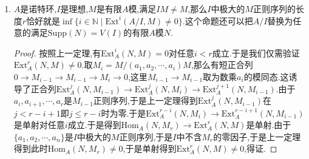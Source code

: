 \begin{enumerate}
\begin{proof}
		\qquad
		
		于是$n=1$得证.下面设$n\ge2$,取$a\in I$是一个$M$正则元,考虑短正合列$0\to M\to M\to M'\to0$.这里$M\to M$取做数乘$a$的模同态,这里$M'=M/aM$.那么这个短正合列诱导了长正合列$\cdots\to\mathrm{Ext}^i(N,M)\to\mathrm{Ext}^i(N,M)\to\mathrm{Ext}^i(N,M')\to\mathrm{Ext}^{i+1}(N,M)\to\cdots$.那么有$\mathrm{Ext}^i(N,M')=0$对任意$i<n$成立.于是归纳假设知$M'=M/aM$中存在长度为$n-1$的$M'$正则序列$\{a_1,a_2,\cdots,a_{n-1}\}$,于是$\{a,a_1,a_2,\cdots,a_{n-1}\}$是$M$正则序列.
		
		\qquad
		
		最后证明(d)$\Rightarrow$(a),对$n$归纳,设$I$中有$M$正则序列$\{a_1,a_2,\cdots,a_n\}$.记$M'=M/a_1M$,那么有短正合列$0\to M\to M\to M'\to0$,这里$M\to M$是数乘$a_1$的映射.那么$M'$中存在长度为$n-1$的正则序列.按照归纳假设,有$\mathrm{Ext}^i(N,M')=0$对任意的$i<n-1$和任意满足条件的$N$成立(对$n=1$这是平凡的).于是对任意$i<n$有长正合列中的$f:\mathrm{Ext}^i(N,M)\to\mathrm{Ext}^i(N,M)$的由数乘$a_1$诱导的同态是单的.下面按照条件有$V(\mathrm{Ann}(N))=\mathrm{Supp}(N)\subseteq V(I)$,于是$a_1\in I\subset\sqrt{\mathrm{Ann}(N)}$.于是有某个次幂$a_i^uN=0$.但是$f$就是数乘$a_1$的映射(写出同调的定义).于是$f$的某个次幂是零映射,结合它是单射,得到$\mathrm{Ext}^i(N,M)=0,\forall i<n$.
	\end{proof}
	\item $A$是诺特环,$I$是理想,$M$是有限$A$模,满足$IM\not=M$,那么$I$中极大的$M$正则序列的长度$r$恰好就是$\inf\{i\in\mathbb{N}\mid \mathrm{Ext}^i(A/I,M)\not=0\}$.这个命题还可以把$A/I$替换为任意的满足$\mathrm{Supp}(N)=V(I)$的有限$A$模$N$.
	\begin{proof}
		
		按照上一定理,有$\mathrm{Ext}^i_A(N,M)=0$对任意$i<r$成立.于是我们仅需验证$\mathrm{Ext}^r_A(N,M)\not=0$.取$M_i=M/(a_1,a_2,\cdots,a_i)M$,那么有短正合列$0\to M_{i-1}\to M_{i-1}\to M_i\to0$,这里$M_{i-1}\to M_{i-1}$取为数乘$a_i$的模同态.这诱导了正合列$\mathrm{Ext}^j_A(N,M_{i-1})\to\mathrm{Ext}^j_A(N,M_i)\to\mathrm{Ext}^{j+1}_A(N,M_{i-1})$.由于$a_i,a_{i+1},\cdots,a_r$是$M_{i-1}$正则序列,于是上一定理得到$\mathrm{Ext}_A^j(N,M_{i-1})$在$j<r-i+1$即$j\le r-i$时为零.于是$\mathrm{Ext}^{r-i}_A(N,M_i)\to\mathrm{Ext}^{r-i+1}_A(N,M_{i-1})$是单射对任意$i$成立.于是得到$\mathrm{Hom}_A(N,M_r)\to\mathrm{Ext}_A^r(N,M)$是单射.由于$\{a_1,a_2,\cdots,a_n\}$是$I$中极大的$M$正则序列,于是$I$中不含$M_r$的零因子,于是上一定理得到此时$\mathrm{Hom}_A(N,M_r)\not=0$,于是单射得到$\mathrm{Ext}^r_A(N,M)\not=0$,得证.
	\end{proof}
\end{enumerate}

